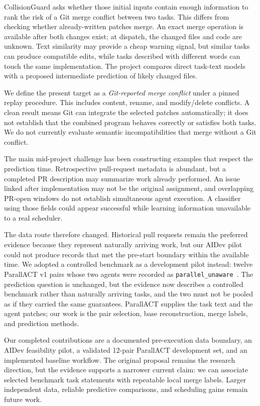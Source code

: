 \documentclass[sigconf,authorversion,nonacm]{acmart}
\begin{document}
CollisionGuard asks whether those initial inputs contain enough information to rank the risk of a Git merge conflict between two tasks. This differs from checking whether already-written patches merge. An exact merge operation is available after both changes exist; at dispatch, the changed files and code are unknown. Text similarity may provide a cheap warning signal, but similar tasks can produce compatible edits, while tasks described with different words can touch the same implementation. The project compares direct task-text models with a proposed intermediate prediction of likely changed files.

We define the present target as a \emph{Git-reported merge conflict} under a pinned replay procedure. This includes content, rename, and modify/delete conflicts. A clean result means Git can integrate the selected patches automatically; it does not establish that the combined program behaves correctly or satisfies both tasks. We do not currently evaluate semantic incompatibilities that merge without a Git conflict.

The main mid-project challenge has been constructing examples that respect the prediction time. Retrospective pull-request metadata is abundant, but a completed PR description may summarize work already performed. An issue linked after implementation may not be the original assignment, and overlapping PR-open windows do not establish simultaneous agent execution. A classifier using those fields could appear successful while learning information unavailable to a real scheduler.

The data route therefore changed. Historical pull requests remain the preferred evidence because they represent naturally arriving work, but our AIDev pilot could not produce records that met the pre-start boundary within the available time. We adopted a controlled benchmark as a development pilot instead: twelve ParallACT v1 pairs whose two agents were recorded as \texttt{parallel\_unaware}~\cite{parallact2026}. The prediction question is unchanged, but the evidence now describes a controlled benchmark rather than naturally arriving tasks, and the two must not be pooled as if they carried the same guarantees. ParallACT supplies the task text and the agent patches; our work is the pair selection, base reconstruction, merge labels, and prediction methods.

Our completed contributions are a documented pre-execution data boundary, an AIDev feasibility pilot, a validated 12-pair ParallACT development set, and an implemented baseline workflow. The original proposal remains the research direction, but the evidence supports a narrower current claim: we can associate selected benchmark task statements with repeatable local merge labels. Larger independent data, reliable predictive comparisons, and scheduling gains remain future work.
\end{document}
